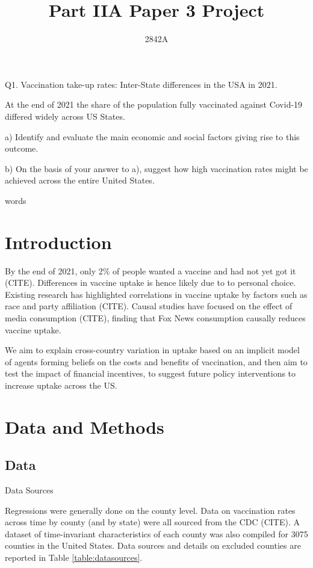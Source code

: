 \documentclass[12pt]{article}
\title{Part IIA Paper 3 Project}
\author{
	2842A
}
\newcommand\wordcount{
	\immediate\write18{texcount -sum -1 \jobname.tex > count.txt} 
	
}
\begin{document}
	\maketitle
	\begin{spacing}{1.5} %
		Q1. Vaccination take-up rates: Inter-State differences in the USA in 2021.
		
		At the end of 2021 the share of the population fully vaccinated against Covid-19 differed widely across US States.
		
		a) Identify and evaluate the main economic and social factors giving rise to this outcome.
		
		b) On the basis of your answer to a), suggest how high vaccination rates might be achieved across the entire United States.
		
		\wordcount words
		\pagebreak
		\section{Introduction}
		By the end of 2021, only 2\% of people wanted a vaccine and had not yet got it (CITE). Differences in vaccine uptake is hence likely due to to personal choice. Existing research has highlighted correlations in vaccine uptake by factors such as race and party affiliation (CITE). Causal studies have focused on the effect of media consumption (CITE), finding that Fox News consumption causally reduces vaccine uptake.
		
		We aim to explain cross-country variation in uptake based on an implicit model of agents forming beliefs on the costs and benefits of vaccination, and then aim to test the impact of financial incentives, to suggest future policy interventions to increase uptake across the US.
		
		\section{Data and Methods}
		\subsection{Data}
		
		\begin{table}
			\caption{Data Sources}
			
			\label{table:datasources}
		\end{table}
	
		Regressions were generally done on the county level. Data on vaccination rates across time by county (and by state) were all sourced from the CDC (CITE). A dataset of time-invariant characteristics of each county was also compiled for 3075 counties in the United States. Data sources and details on excluded counties are reported in Table \ref{table:datasources}.
		

\end{spacing}
\end{document}
